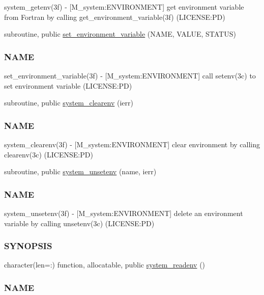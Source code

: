\begin{DoxyCompactItemize}
\begin{DoxyCompactList}
system\+\_\+getenv(3f) -\/ \mbox{[}M\+\_\+system\+:E\+N\+V\+I\+R\+O\+N\+M\+E\+NT\mbox{]} get environment variable from Fortran by calling get\+\_\+environment\+\_\+variable(3f) (L\+I\+C\+E\+N\+SE\+:PD) \end{DoxyCompactList}\item 
subroutine, public \mbox{\hyperlink{namespacem__system_ad813765403a5d9d6fb7a2edcb669fe4b}{set\+\_\+environment\+\_\+variable}} (N\+A\+ME, V\+A\+L\+UE, S\+T\+A\+T\+US)
\begin{DoxyCompactList}\small\item\em \subsubsection*{N\+A\+ME}

set\+\_\+environment\+\_\+variable(3f) -\/ \mbox{[}M\+\_\+system\+:E\+N\+V\+I\+R\+O\+N\+M\+E\+NT\mbox{]} call setenv(3c) to set environment variable (L\+I\+C\+E\+N\+SE\+:PD) \end{DoxyCompactList}\item 
subroutine, public \mbox{\hyperlink{namespacem__system_a9c34787b170ab8d41000d7c3acb60736}{system\+\_\+clearenv}} (ierr)
\begin{DoxyCompactList}\small\item\em \subsubsection*{N\+A\+ME}

system\+\_\+clearenv(3f) -\/ \mbox{[}M\+\_\+system\+:E\+N\+V\+I\+R\+O\+N\+M\+E\+NT\mbox{]} clear environment by calling clearenv(3c) (L\+I\+C\+E\+N\+SE\+:PD) \end{DoxyCompactList}\item 
subroutine, public \mbox{\hyperlink{namespacem__system_a61b67b46b35490ec308773b65c3376a3}{system\+\_\+unsetenv}} (name, ierr)
\begin{DoxyCompactList}\small\item\em \subsubsection*{N\+A\+ME}

system\+\_\+unsetenv(3f) -\/ \mbox{[}M\+\_\+system\+:E\+N\+V\+I\+R\+O\+N\+M\+E\+NT\mbox{]} delete an environment variable by calling unsetenv(3c) (L\+I\+C\+E\+N\+SE\+:PD) \subsubsection*{S\+Y\+N\+O\+P\+S\+IS}\end{DoxyCompactList}\item 
character(len=\+:) function, allocatable, public \mbox{\hyperlink{namespacem__system_ae0e43010a82a6a25402568ccb326322d}{system\+\_\+readenv}} ()
\begin{DoxyCompactList}\small\item\em \subsubsection*{N\+A\+ME}


\end{DoxyCompactList}
\end{DoxyCompactItemize}
